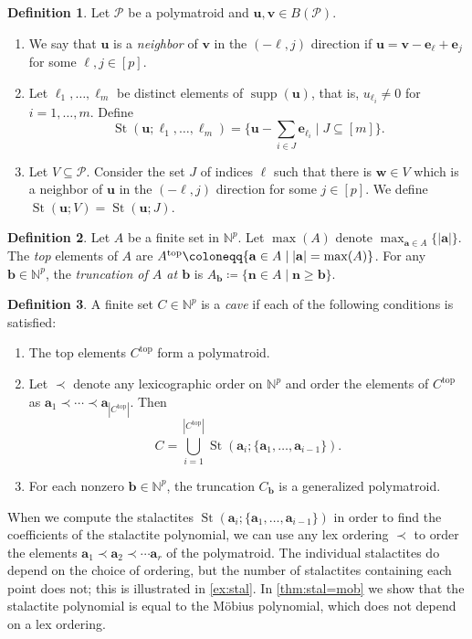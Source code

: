 \documentclass[a4paper, 11pt]{amsart}
\theoremstyle{definition}
\newtheorem{definition}[definition]{Definition}
\newcommand{\bfu}{\mathbf{u}}
\newcommand{\bfv}{\mathbf{v}}
\newcommand{\bfn}{\mathbf{n}}
\newcommand{\bfa}{\mathbf{a}}
\newcommand{\bfb}{\mathbf{b}}
\newcommand{\bfe}{\mathbf{e}}
\newcommand{\sP}{\mathscr{P}}
\newcommand{\N}{\mathbb{N}}
\newcommand{\ds}{\displaystyle}
\DeclareMathOperator{\St}{St}
\DeclareMathOperator{\supp}{supp}
\begin{document}
\begin{definition} 
Let $\sP$ be a polymatroid and $\bfu,\bfv \in B(\sP)$. 
\begin{enumerate}
    \item We say that $\bfu$ is a \textit{neighbor} of $\bfv$ in the $(-\ell,j)$ direction if $\bfu=\bfv-\bfe_{\ell}+\bfe_j$ for some $\ell,j \in [p]$. 
    \item Let $\ell_1,\ldots,\ell_m$ be distinct elements of $\supp(\bfu)$, that is, $u_{\ell_i} \ne 0$ for $i=1,\ldots,m$. Define
    $$\St(\bfu;\ell_1,\ldots,\ell_m) = \Big\{\bfu-\sum_{i\in J} \bfe_{\ell_i} \mid J \subseteq [m]\Big\}. $$
    \item Let $V \subseteq \sP$. Consider the set $J$ of indices $\ell$ such that there is $\mathbf{w}\in V$ which is a neighbor of $\bfu$ in the $(-\ell,j)$ direction for some $j \in [p]$. We define $\St(\bfu;V) = \St(\bfu;J)$. 
\end{enumerate}
\end{definition}

\begin{definition} Let $A$ be a finite set in $\N^p$.
Let $\max(A)$ denote $\ds\max_{\bfa \in A}\{|\bfa|\}$. The \textit{top} elements of $A$ are $A^{\rm{top}} \coloneqq \{\bfa \in A \mid |\bfa| = \max(A)\}$. 
For any $\bfb \in \N^p$, the \textit{truncation of $A$ at $\bfb$} is $A_\bfb \coloneqq \{\bfn \in A \mid \bfn\ge\bfb\}$.
\end{definition}

\begin{definition}
    A finite set $C \in \N^p$ is a \textit{cave} if each of the following conditions is satisfied:
    \begin{enumerate}
        \item The top elements $C^{\mathrm{top}}$ form a polymatroid. 
        \item Let $\prec$ denote any lexicographic order on $\N^p$ and order the elements of $C^{\mathrm{top}}$ as $\bfa_1 \prec \cdots \prec \bfa_{|C^{\mathrm{top}}|}$. Then 
        $$C = \bigcup_{i=1}^{|C^{\mathrm{top}}|} \St(\bfa_i;\{\bfa_1,\ldots,\bfa_{i-1}\}).$$
        \item For each nonzero $\bfb \in \N^p$, the truncation $C_\bfb$ is a generalized polymatroid. 
    \end{enumerate}
\end{definition}


 When we compute the stalactites $\St(\bfa_i;\{\bfa_1,\ldots,\bfa_{i-1}\})$ in order to find the coefficients of the stalactite polynomial, we can use any lex ordering $\prec$ to order the elements $\bfa_1 \prec \bfa_2 \prec \cdots \bfa_r$ of the polymatroid. The individual stalactites do depend on the choice of ordering, but the number of stalactites containing each point does not; this is illustrated in \autoref{ex:stal}. In \autoref{thm:stal=mob} we show that the stalactite polynomial is equal to the M\"obius polynomial, which does not depend on a lex ordering.   
 
\end{document}
